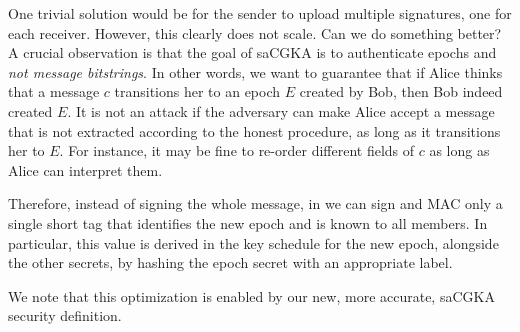 One trivial solution would be for the sender to upload multiple signatures, one for each receiver. However, this clearly does not scale. Can we do something better?
A crucial observation is that the goal of saCGKA is to authenticate epochs and \emph{not message bitstrings}. In other words, we want to guarantee that if Alice thinks that a message $c$ transitions her to an epoch $E$ created by Bob, then Bob indeed created $E$. It is not an attack if the adversary can make Alice accept a message that is not extracted according to the honest procedure, as long as it transitions her to $E$. For instance, it may be fine to re-order different fields of $c$ as long as Alice can interpret them.

Therefore, instead of signing the whole message, in \saik we can sign and MAC only a single short tag that identifies the new epoch and is known to all members. In particular, this value is derived in the key schedule for the new epoch, alongside the other secrets, by hashing the epoch secret with an appropriate label.

We note that this optimization is enabled by our new, more accurate, saCGKA security definition.

